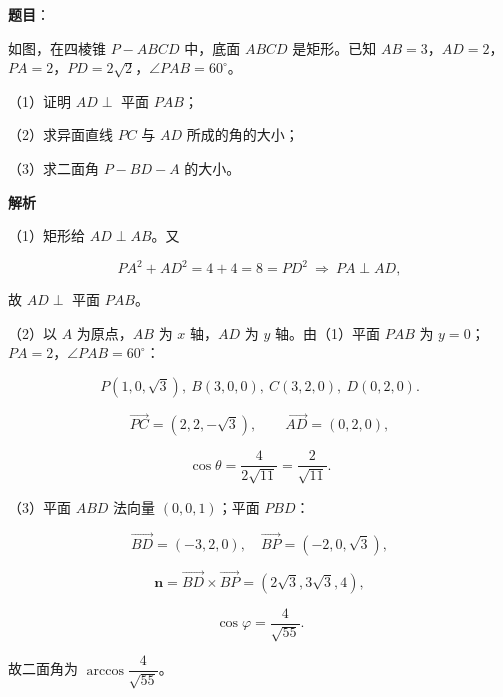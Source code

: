 \begin{answer}

\textbf{题目}：

如图，在四棱锥 $P-ABCD$ 中，底面 $ABCD$ 是矩形。已知 $AB=3$，$AD=2$，$PA=2$，$PD=2\sqrt2$，$\angle PAB=60^\circ$。

（1）证明 $AD\perp$ 平面 $PAB$；

（2）求异面直线 $PC$ 与 $AD$ 所成的角的大小；

（3）求二面角 $P-BD-A$ 的大小。
\nopagebreak[4]
\begin{center}\end{center}
\nopagebreak[4]
\textbf{解析}

（1）矩形给 $AD\perp AB$。又

\nopagebreak[4]
\[PA^2+AD^2=4+4=8=PD^2\ \Longrightarrow\ PA\perp AD,\]

故 $AD\perp$ 平面 $PAB$。

（2）以 $A$ 为原点，$AB$ 为 $x$ 轴，$AD$ 为 $y$ 轴。由（1）平面 $PAB$ 为 $y=0$；$PA=2$，$\angle PAB=60^\circ$：

\nopagebreak[4]
\[P(1,0,\sqrt3),\ B(3,0,0),\ C(3,2,0),\ D(0,2,0).\]

\nopagebreak[4]
\[\overrightarrow{PC}=(2,2,-\sqrt3),\qquad \overrightarrow{AD}=(0,2,0),\]

\nopagebreak[4]
\[\cos\theta=\frac4{2\sqrt{11}}=\frac2{\sqrt{11}}.\]

（3）平面 $ABD$ 法向量 $(0,0,1)$；平面 $PBD$：

\nopagebreak[4]
\[\overrightarrow{BD}=(-3,2,0),\quad \overrightarrow{BP}=(-2,0,\sqrt3),\]

\nopagebreak[4]
\[\boldsymbol n=\overrightarrow{BD}\times\overrightarrow{BP}=(2\sqrt3,3\sqrt3,4),\]

\nopagebreak[4]
\[\cos\varphi=\frac4{\sqrt{55}}.\]

故二面角为 $\arccos\dfrac4{\sqrt{55}}$。


\end{answer}
